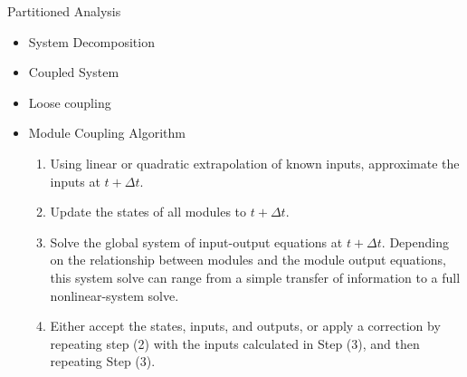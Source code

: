 \documentclass[xcolor=cmyk]{beamer}
\begin{document}

\begin{frame}{Partitioned Analysis}
   \begin{itemize}
       \item
       System Decomposition
       \item
       Coupled System
       \item
       Loose coupling
       \item
       Module Coupling Algorithm \pause
       \begin{enumerate}

\item Using linear or quadratic extrapolation of known inputs, approximate the inputs at $t+\Delta t$.  \pause

\item Update the states of all modules to $t + \Delta t$.  \pause

\item Solve the global system of input-output equations at $t + \Delta t$.  Depending on the relationship between modules and the module output equations, this system solve can range from a simple transfer of information to a full nonlinear-system solve. \pause

\item Either accept the states, inputs, and outputs, or apply a correction by repeating step (2) with the inputs calculated in Step (3), and then repeating Step (3).

\end{enumerate}

       
   \end{itemize}
\end{frame}
\end{document}
